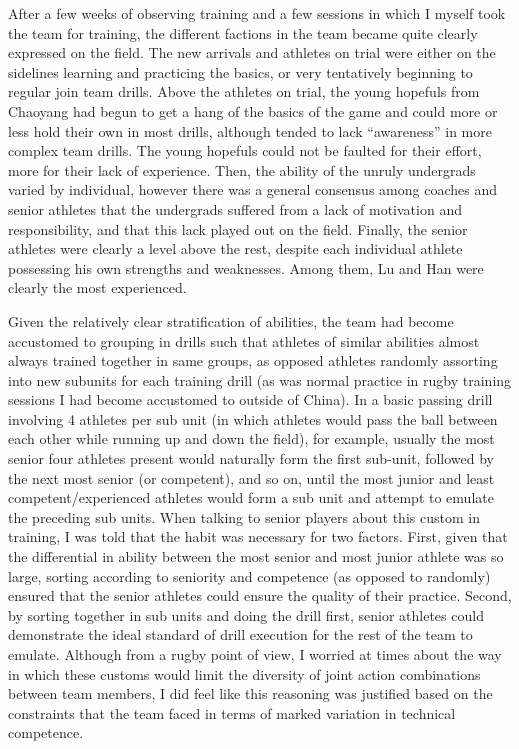 \begin{CJK}{UTF8}{gbsn}
  After a few weeks of observing training and a few sessions in which I myself took the team for training, the different factions in the team became quite clearly expressed on the field.  The new arrivals and athletes on trial were either on the sidelines learning and practicing the basics, or very tentatively beginning to regular join team drills. Above the athletes on trial, the young hopefuls from Chaoyang had begun to get a hang of the basics of the game and could more or less hold their own in most drills, although tended to lack ``awareness'' in more complex team drills. The young hopefuls could not be faulted for their effort, more for their lack of experience. Then, the ability of the unruly undergrads varied by individual, however there was a general consensus among coaches and senior athletes that the undergrads suffered from a lack of motivation and responsibility, and that this lack played out on the field.  Finally, the senior athletes were clearly a level above the rest, despite each individual athlete possessing his own strengths and weaknesses.  Among them, Lu and Han were clearly the most experienced.

  Given the relatively clear stratification of abilities, the team had become accustomed to grouping in drills such that athletes of similar abilities almost always trained together in same groups, as opposed athletes randomly assorting into new subunits for each training drill (as was normal practice in rugby training sessions I had become accustomed to outside of China). In a basic passing drill involving 4 athletes per sub unit (in which athletes would pass the ball between each other while running up and down the field), for example, usually the most senior four athletes present would naturally form the first sub-unit, followed by the next most senior (or competent), and so on, until the most junior and least competent/experienced athletes would form a sub unit and attempt to emulate the preceding sub units.  When talking to senior players about this custom in training, I was told that the habit was necessary for two factors. First, given that the differential in ability between the most senior and most junior athlete was so large, sorting according to seniority and competence (as opposed to randomly) ensured that the senior athletes could ensure the quality of their practice.  Second, by sorting together in sub units and doing the drill first, senior athletes could demonstrate the ideal standard of drill execution for the rest of the team to emulate.  Although from a rugby point of view, I worried at times about the way in which these customs would limit the diversity of joint action combinations between team members, I did feel like this reasoning was justified based on the constraints that the team faced in terms of marked variation in technical competence.


\end{CJK}
